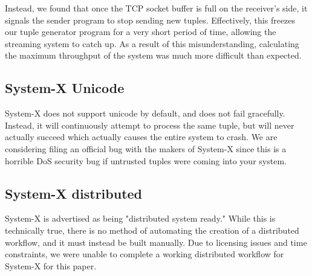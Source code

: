 Instead, we found that once the TCP socket buffer is full on the receiver's side, it signals the sender program to stop sending new tuples.  Effectively, this freezes our tuple generator program for a very short period of time, allowing the streaming system to catch up.  As a result of this misunderstanding, calculating the maximum throughput of the system was much more difficult than expected.

\subsection{System-X Unicode}
System-X does not support unicode by default, and does not fail gracefully.  Instead, it will continuously attempt to process the same tuple, but will never actually succeed which actually causes the entire system to crash. We are considering filing an official bug with the makers of System-X since this is a horrible DoS security bug if untrusted tuples were coming into your system.

\subsection{System-X distributed}
\label{ssec:sysx-dist}
System-X is advertised as being "distributed system ready."  While this is technically true, there is no method of automating the creation of a distributed workflow, and it must instead be built manually.  Due to licensing issues and time constraints, we were unable to complete a working distributed workflow for System-X for this paper.
